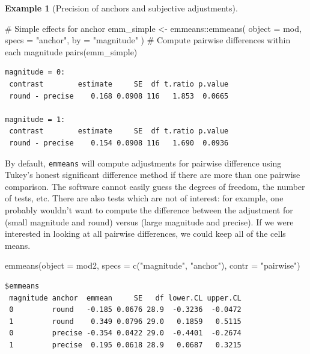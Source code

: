 \documentclass[
  11pt,
  letterpaper,
]{scrbook}
\newenvironment{Shaded}{\begin{snugshade}}{\end{snugshade}}
\newcommand{\AttributeTok}[1]{\textcolor[rgb]{0.40,0.45,0.13}{#1}}
\newcommand{\CommentTok}[1]{\textcolor[rgb]{0.37,0.37,0.37}{#1}}
\newcommand{\FunctionTok}[1]{\textcolor[rgb]{0.28,0.35,0.67}{#1}}
\newcommand{\NormalTok}[1]{\textcolor[rgb]{0.00,0.23,0.31}{#1}}
\newcommand{\OtherTok}[1]{\textcolor[rgb]{0.00,0.23,0.31}{#1}}
\newcommand{\SpecialCharTok}[1]{\textcolor[rgb]{0.37,0.37,0.37}{#1}}
\newcommand{\StringTok}[1]{\textcolor[rgb]{0.13,0.47,0.30}{#1}}
\theoremstyle{definition}
\newtheorem{example}{Example}[chapter]
\theoremstyle{definition}
\theoremstyle{remark}
\begin{document}
\begin{example}[Precision of anchors and subjective
adjustments]
\begin{Shaded}
\begin{Highlighting}[]
\CommentTok{\# Simple effects for anchor}
\NormalTok{emm\_simple }\OtherTok{\textless{}{-}}\NormalTok{ emmeans}\SpecialCharTok{::}\FunctionTok{emmeans}\NormalTok{(}
  \AttributeTok{object =}\NormalTok{ mod,}
  \AttributeTok{specs =} \StringTok{"anchor"}\NormalTok{,}
  \AttributeTok{by =} \StringTok{"magnitude"}
\NormalTok{)}
\CommentTok{\# Compute pairwise differences within each magnitude}
\FunctionTok{pairs}\NormalTok{(emm\_simple)}
\end{Highlighting}
\end{Shaded}

\begin{verbatim}
magnitude = 0:
 contrast        estimate     SE  df t.ratio p.value
 round - precise    0.168 0.0908 116   1.853  0.0665

magnitude = 1:
 contrast        estimate     SE  df t.ratio p.value
 round - precise    0.154 0.0908 116   1.690  0.0936
\end{verbatim}

By default, \texttt{emmeans} will compute adjustments for pairwise
difference using Tukey's honest significant difference method if there
are more than one pairwise comparison. The software cannot easily guess
the degrees of freedom, the number of tests, etc. There are also tests
which are not of interest: for example, one probably wouldn't want to
compute the difference between the adjustment for (small magnitude and
round) versus (large magnitude and precise). If we were interested in
looking at all pairwise differences, we could keep all of the cells
means.

\begin{Shaded}
\begin{Highlighting}[]
\FunctionTok{emmeans}\NormalTok{(}\AttributeTok{object =}\NormalTok{ mod2, }
        \AttributeTok{specs =} \FunctionTok{c}\NormalTok{(}\StringTok{"magnitude"}\NormalTok{, }\StringTok{"anchor"}\NormalTok{), }
        \AttributeTok{contr =} \StringTok{"pairwise"}\NormalTok{)}
\end{Highlighting}
\end{Shaded}

\begin{verbatim}
$emmeans
 magnitude anchor  emmean     SE   df lower.CL upper.CL
 0         round   -0.185 0.0676 28.9  -0.3236  -0.0472
 1         round    0.349 0.0796 29.0   0.1859   0.5115
 0         precise -0.354 0.0422 29.0  -0.4401  -0.2674
 1         precise  0.195 0.0618 28.9   0.0687   0.3215


\end{verbatim}
\end{example}
\end{document}
